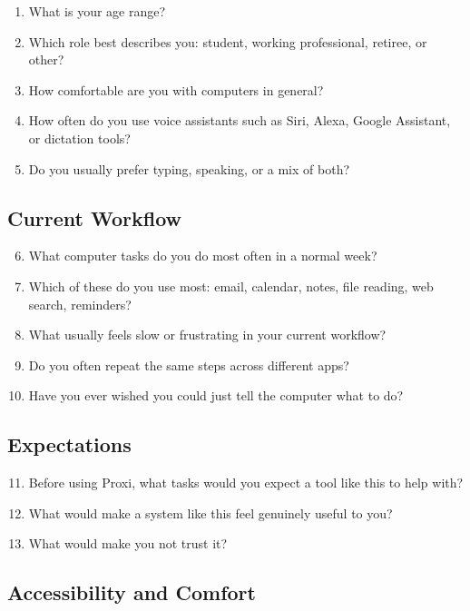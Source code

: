 \documentclass[12pt, titlepage]{article}
\begin{document}
\begin{enumerate}[label=\arabic*.]
    \item What is your age range?
    \item Which role best describes you: student, working professional,
    retiree, or other?
    \item How comfortable are you with computers in general?
    \item How often do you use voice assistants such as Siri, Alexa,
    Google Assistant, or dictation tools?
    \item Do you usually prefer typing, speaking, or a mix of both?
\end{enumerate}

\subsection{Current Workflow}

\begin{enumerate}[label=\arabic*.]
    \setcounter{enumi}{5}
    \item What computer tasks do you do most often in a normal week?
    \item Which of these do you use most: email, calendar, notes, file
    reading, web search, reminders?
    \item What usually feels slow or frustrating in your current
    workflow?
    \item Do you often repeat the same steps across different apps?
    \item Have you ever wished you could just tell the computer what to
    do?
\end{enumerate}

\subsection{Expectations}

\begin{enumerate}[label=\arabic*.]
    \setcounter{enumi}{10}
    \item Before using Proxi, what tasks would you expect a tool like
    this to help with?
    \item What would make a system like this feel genuinely useful to
    you?
    \item What would make you not trust it?
\end{enumerate}

\subsection{Accessibility and Comfort}
\end{document}

